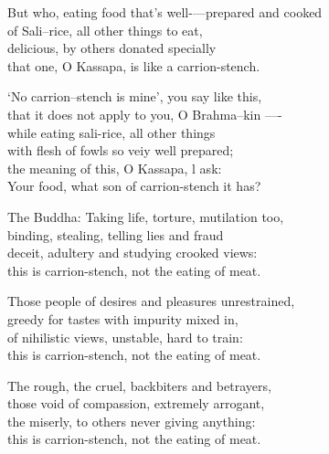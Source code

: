 \begin{MyDescription}{}
But who, eating food that's well-—prepared and cooked\\
of Sali--rice, all other things to eat,\\
delicious, by others donated specially\\
that one, O Kassapa, is like a carrion-stench.
\end{MyDescription}

\begin{MyDescription}{}
`No carrion--stench is mine', you say like this,\\
that it does not apply to you, O Brahma--kin —-\\
while eating sali-rice, all other things\\
with ﬂesh of fowls so veiy well prepared;\\
the meaning of this, O Kassapa, l ask:\\
Your food, what son of carrion-stench it has?
\end{MyDescription}

\begin{MyDescription}{The Buddha:}
Taking life, torture, mutilation too,\\
binding, stealing, telling lies and fraud\\
deceit, adultery and studying crooked views:\\
this is carrion-stench, not the eating of meat.
\end{MyDescription}

\begin{MyDescription}{}
Those people of desires and pleasures unrestrained,\\
greedy for tastes with impurity mixed in,\\
of nihilistic views, unstable, hard to train:\\
this is carrion-stench, not the eating of meat.
\end{MyDescription}

\begin{MyDescription}{}
The rough, the cruel, backbiters and betrayers,\\
those void of compassion, extremely arrogant,\\
the miserly, to others never giving anything:\\
this is carrion-stench, not the eating of meat.
\end{MyDescription}    


